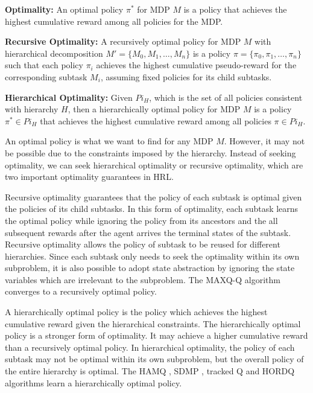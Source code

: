 \begin{definition}
    \textbf{Optimality:} An optimal policy $\pi^*$ for MDP $M$ is a policy that achieves the highest cumulative reward
    among all policies for the MDP.
\end{definition}
\begin{definition}
    \textbf{Recursive Optimality:} A recursively optimal policy for MDP $M$ with hierarchical 
    decomposition $M' = \{M_0, M_1, \dots, M_n\}$ is a policy $\pi = \{\pi_0, \pi_1, \dots, \pi_n\}$ such
    that each policy $\pi_i$ achieves the highest cumulative pseudo-reward for the corresponding subtask $M_i$,
    assuming fixed policies for its child subtasks.
\end{definition}
\begin{definition}
    \textbf{Hierarchical Optimality:} Given $Pi_H$, which is the set of all policies consistent with hierarchy $H$, 
    then a hierarchically optimal policy for MDP $M$ is a policy $\pi^* \in Pi_H$ that achieves the highest cumulative reward
    among all policies $\pi \in Pi_H$.
\end{definition}

An optimal policy is what we want to find for any MDP $M$. However, it may not be possible
due to the constraints imposed by the hierarchy. Instead of seeking optimality, 
we can seek hierarchical optimality or recursive optimality, which are two important 
optimality guarantees in HRL.

Recursive optimality guarantees that the policy of each subtask is optimal given the policies of its child subtasks.
In this form of optimality, each subtask learns the optimal policy while ignoring the policy from its ancestors
and the all subsequent rewards after the agent arrives the terminal states of the subtask.
Recursive optimality allows the policy of subtask to be reused for different hierarchies. Since
each subtask only needs to seek the optimality within its own subproblem, it is also possible
to adopt state abstraction by ignoring the state variables which are irrelevant
to the subproblem. The MAXQ-Q \cite{MaxQJ} algorithm converges to a recursively optimal policy. 

A hierarchically optimal policy is the policy which achieves the highest cumulative reward given the
hierarchical constraints. The hierarchically optimal policy is a stronger form of optimality. It
may achieve a higher cumulative reward than a recursively optimal policy. In hierarchical optimality, 
the policy of each subtask may not be optimal within its own subproblem, but the overall policy 
of the entire hierarchy is optimal. The HAMQ \cite{HAMQ}, SDMP \cite{SMDP}, tracked Q and HORDQ \cite{HORDQ} algorithms learn
a hierarchically optimal policy.

